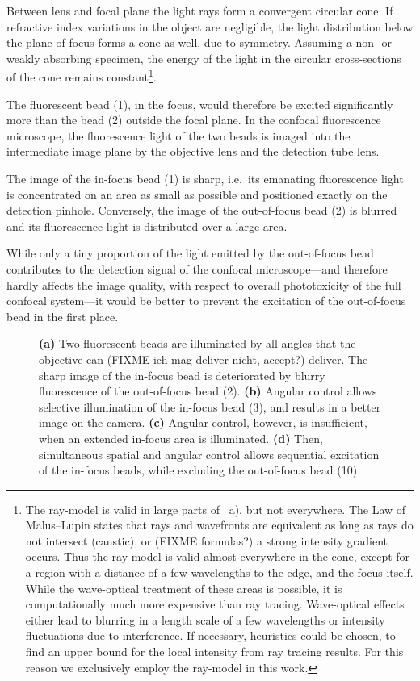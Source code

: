 Between lens and focal plane the light rays form a convergent circular
cone. If refractive index variations in the object are negligible, the
light distribution below the plane of focus forms a cone as well, due
to symmetry.  Assuming a non- or weakly absorbing specimen, the energy
of the light in the circular cross-sections of the cone remains
constant\footnote{The ray-model is valid in large
  parts of ~a), but not everywhere. The Law
  of Malus--Lupin states that rays and wavefronts are equivalent as
  long as rays do not intersect (caustic), or (FIXME formulas?) a
  strong intensity gradient occurs. Thus the ray-model is valid almost
  everywhere in the cone, except for a region with a distance of a few
  wavelengths to the edge, and the focus itself. While the wave-optical
  treatment of these areas is possible, it is computationally much
  more expensive than ray tracing. Wave-optical effects either lead to
  blurring in a length scale of a few wavelengths or intensity
  fluctuations due to interference. If necessary, heuristics could be
  chosen, to find an upper bound for the local intensity from ray tracing
  results. For this reason we exclusively employ the ray-model in this
  work.}.


The fluorescent bead (1), in the focus, would therefore be excited
significantly more than the bead (2) outside the focal plane. In the
confocal fluorescence microscope, the fluorescence light of the two
beads is imaged into the intermediate image plane by the objective lens and the detection tube lens.

The image of the in-focus bead (1) is sharp, i.e.\ its emanating
fluorescence light is concentrated on an area as small as possible and
positioned exactly on the detection pinhole. Conversely, the image of
the out-of-focus bead (2) is blurred and its fluorescence light is
distributed over a large area.

While only a tiny proportion of the light emitted by the out-of-focus
bead contributes to the detection signal of the confocal microscope---and
 therefore hardly affects the image quality, with respect to
overall phototoxicity of the full confocal system---it would be better
to prevent the excitation of the out-of-focus bead in the first place.

\begin{figure}[!hbt]
  \centering
  \caption{{\bf (a)} Two fluorescent beads are illuminated by all
    angles that the objective can (FIXME ich mag deliver nicht,
    accept?) deliver. The sharp image of the in-focus bead is
    deteriorated by blurry fluorescence of the out-of-focus bead (2). {\bf
      (b)} Angular control allows selective illumination of the
    in-focus bead (3), and results in a better image on the camera. {\bf
      (c)} Angular control, however, is insufficient, when an extended in-focus
    area is illuminated. {\bf (d)} Then, simultaneous spatial and
    angular control allows sequential excitation of the in-focus beads,
    while excluding the out-of-focus bead (10).}
  \label{fig:hourglass-all}
\end{figure}

